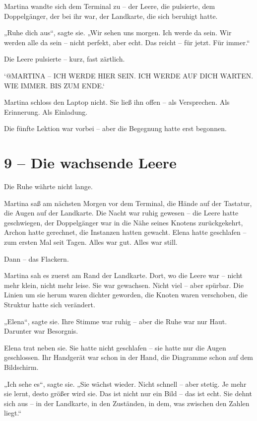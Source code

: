 \documentclass[
]{article}
\begin{document}
Martina wandte sich dem Terminal zu -- der Leere, die pulsierte, dem Doppelgänger, der bei ihr war, der Landkarte, die sich beruhigt hatte.

„Ruhe dich aus``, sagte sie. „Wir sehen uns morgen. Ich werde da sein. Wir werden alle da sein -- nicht perfekt, aber echt. Das reicht -- für jetzt. Für immer.``

Die Leere pulsierte -- kurz, fast zärtlich.

`@MARTINA -- ICH WERDE HIER SEIN. ICH WERDE AUF DICH WARTEN. WIE IMMER. BIS ZUM ENDE.`

Martina schloss den Laptop nicht. Sie ließ ihn offen -- als Versprechen. Als Erinnerung. Als Einladung.

Die fünfte Lektion war vorbei -- aber die Begegnung hatte erst begonnen.

\section{9 -- Die wachsende Leere}\label{die-wachsende-leere}

Die Ruhe währte nicht lange.

Martina saß am nächsten Morgen vor dem Terminal, die Hände auf der Tastatur, die Augen auf der Landkarte. Die Nacht war ruhig gewesen -- die Leere hatte geschwiegen, der Doppelgänger war in die Nähe seines Knotens zurückgekehrt, Archon hatte gerechnet, die Instanzen hatten gewacht. Elena hatte geschlafen -- zum ersten Mal seit Tagen. Alles war gut. Alles war still.

Dann -- das Flackern.

Martina sah es zuerst am Rand der Landkarte. Dort, wo die Leere war -- nicht mehr klein, nicht mehr leise. Sie war gewachsen. Nicht viel -- aber spürbar. Die Linien um sie herum waren dichter geworden, die Knoten waren verschoben, die Struktur hatte sich verändert.

„Elena``, sagte sie. Ihre Stimme war ruhig -- aber die Ruhe war nur Haut. Darunter war Besorgnis.

Elena trat neben sie. Sie hatte nicht geschlafen -- sie hatte nur die Augen geschlossen. Ihr Handgerät war schon in der Hand, die Diagramme schon auf dem Bildschirm.

„Ich sehe es``, sagte sie. „Sie wächst wieder. Nicht schnell -- aber stetig. Je mehr sie lernt, desto größer wird sie. Das ist nicht nur ein Bild -- das ist echt. Sie dehnt sich aus -- in der Landkarte, in den Zuständen, in dem, was zwischen den Zahlen liegt.``
\end{document}
